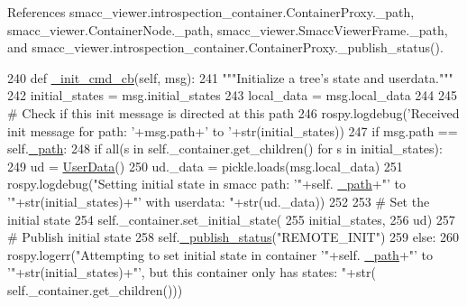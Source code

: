 References smacc\+\_\+viewer.\+introspection\+\_\+container.\+Container\+Proxy.\+\_\+path, smacc\+\_\+viewer.\+Container\+Node.\+\_\+path, smacc\+\_\+viewer.\+Smacc\+Viewer\+Frame.\+\_\+path, and smacc\+\_\+viewer.\+introspection\+\_\+container.\+Container\+Proxy.\+\_\+publish\+\_\+status().


\begin{DoxyCode}
240     \textcolor{keyword}{def }\hyperlink{classsmacc__viewer_1_1introspection__container_1_1ContainerProxy_ac2ba62ed1b72c1dc6ea8e5badb6f2030}{\_init\_cmd\_cb}(self, msg):
241         \textcolor{stringliteral}{"""Initialize a tree's state and userdata."""}
242         initial\_states = msg.initial\_states
243         local\_data = msg.local\_data
244 
245         \textcolor{comment}{# Check if this init message is directed at this path}
246         rospy.logdebug(\textcolor{stringliteral}{'Received init message for path: '}+msg.path+\textcolor{stringliteral}{' to '}+str(initial\_states))
247         \textcolor{keywordflow}{if} msg.path == self.\hyperlink{classsmacc__viewer_1_1introspection__container_1_1ContainerProxy_a1196c9f62c5bf656de0dddba97f57884}{\_path}:
248             \textcolor{keywordflow}{if} all(s \textcolor{keywordflow}{in} self.\_container.get\_children() \textcolor{keywordflow}{for} s \textcolor{keywordflow}{in} initial\_states):
249                 ud = \hyperlink{classsmacc__viewer_1_1smacc__user__data_1_1UserData}{UserData}()
250                 ud.\_data = pickle.loads(msg.local\_data)
251                 rospy.logdebug(\textcolor{stringliteral}{"Setting initial state in smacc path: '"}+self.
      \hyperlink{classsmacc__viewer_1_1introspection__container_1_1ContainerProxy_a1196c9f62c5bf656de0dddba97f57884}{\_path}+\textcolor{stringliteral}{"' to '"}+str(initial\_states)+\textcolor{stringliteral}{"' with userdata: "}+str(ud.\_data))
252 
253                 \textcolor{comment}{# Set the initial state}
254                 self.\_container.set\_initial\_state(
255                         initial\_states,
256                         ud)
257                 \textcolor{comment}{# Publish initial state}
258                 self.\hyperlink{classsmacc__viewer_1_1introspection__container_1_1ContainerProxy_ad4a053afedd3cc6cdc2e30b6db418e7e}{\_publish\_status}(\textcolor{stringliteral}{"REMOTE\_INIT"})
259             \textcolor{keywordflow}{else}:
260                 rospy.logerr(\textcolor{stringliteral}{"Attempting to set initial state in container '"}+self.
      \hyperlink{classsmacc__viewer_1_1introspection__container_1_1ContainerProxy_a1196c9f62c5bf656de0dddba97f57884}{\_path}+\textcolor{stringliteral}{"' to '"}+str(initial\_states)+\textcolor{stringliteral}{"', but this container only has states: "}+str(
      self.\_container.get\_children()))\end{DoxyCode}


